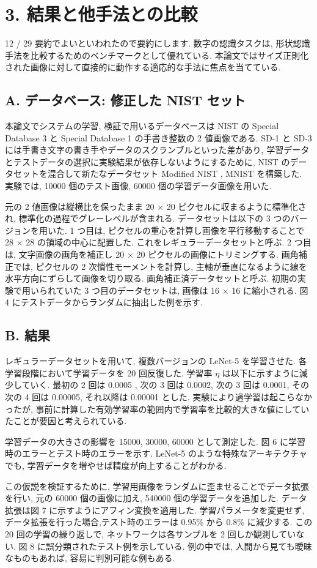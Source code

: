 \documentclass[twocolumn]{jarticle}     %
\begin{document}
 \section{3. 結果と他手法との比較}
 12 / 29 要約でよいといわれたので要約にします.
 数字の認識タスクは, 形状認識手法を比較するためのベンチマークとして優れている. 
 本論文ではサイズ正則化された画像に対して直接的に動作する適応的な手法に焦点を当てている.

 \subsection{A. データベース: 修正した NIST セット}

本論文でシステムの学習, 検証で用いるデータベースは NIST の Special Database 3 と Special Database 1 の手書き整数の 2 値画像である. SD-1 と SD-3 には手書き文字の書き手やデータのスクランブルといった差があり, 
学習データとテストデータの選択に実験結果が依存しないようにするために, NIST のデータセットを混合して新たなデータセット Modified NIST , MNIST を構築した.
実験では, 10000 個のテスト画像, 60000 個の学習データ画像を用いた. 
\par
元の 2 値画像は縦横比を保ったまま 20 × 20 ピクセルに収まるように標準化され, 標準化の過程でグレーレベルが含まれる.
データセットは以下の 3 つのバージョンを用いた.
1 つ目は, ピクセルの重心を計算し画像を平行移動することで 28 × 28 の領域の中心に配置した. これをレギュラーデータセットと呼ぶ. 
2 つ目は, 文字画像の画角を補正し 20 × 20 ピクセルの画像にトリミングする. 画角補正では, ピクセルの 2 次慣性モーメントを計算し, 主軸が垂直になるように線を水平方向にずらして画像を切り取る. 
画角補正済データセットと呼ぶ.
 初期の実験で用いられていた 3 つ目のデータセットは, 画像は 16 × 16 に縮小される. 図 4 にテストデータからランダムに抽出した例を示す.

\subsection{B. 結果}
レギュラーデータセットを用いて, 複数バージョンの LeNet-5 を学習させた. 
各学習段階において学習データを 20 回反復した. 
学習率 $\eta$ は以下に示すように減少していく. 
最初の 2 回は 0.0005 , 次の 3 回は 0.0002, 次の 3 回は 0.0001, その次の 4 回は 0.00005, それ以降は 0.00001 とした. 
実験により過学習は起こらなかったが, 事前に計算した有効学習率の範囲内で学習率を比較的大きな値にしていたことが要因と考えられている.
\par
学習データの大きさの影響を 15000, 30000, 60000 として測定した. 図 6 に学習時のエラーとテスト時のエラーを示す.
LeNet-5 のような特殊なアーキテクチャでも, 学習データを増やせば精度が向上することがわかる.
\par
この仮説を検証するために, 学習用画像をランダムに歪ませることでデータ拡張を行い, 元の 60000 個の画像に加え, 540000 個の学習データを追加した. データ拡張は図 7 に示すようにアフィン変換を適用した.
学習パラメータを変更せず, データ拡張を行った場合,テスト時のエラーは 0.95\% から 0.8\% に減少する. 
この 20 回の学習の繰り返しで, ネットワークは各サンプルを 2 回しか観測していない. 
図 8 に誤分類されたテスト例を示している.
例の中では, 人間から見ても曖昧なものもあれば, 容易に判別可能な例もある. 
\end{document}
